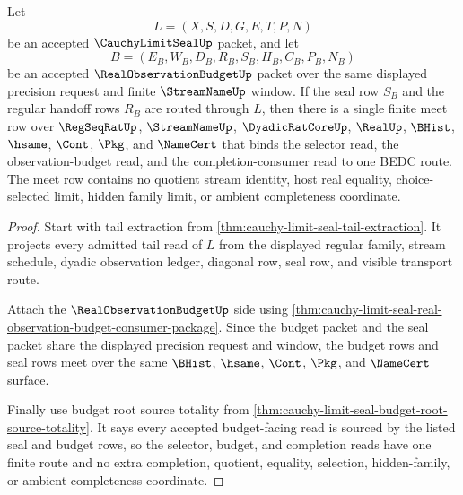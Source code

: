 \begin{theorem}
\label{thm:cauchy-limit-seal-tail-budget-meet}
Let
$$
L=(X,S,D,G,E,T,P,N)
$$
be an accepted $\CauchyLimitSealUp$ packet, and let
$$
B=(E_B,W_B,D_B,R_B,S_B,H_B,C_B,P_B,N_B)
$$
be an accepted $\RealObservationBudgetUp$ packet over the same displayed precision request and finite $\StreamNameUp$ window. If the seal row $S_B$ and the regular handoff rows $R_B$ are routed through $L$, then there is a single finite meet row over $\RegSeqRatUp$, $\StreamNameUp$, $\DyadicRatCoreUp$, $\RealUp$, $\BHist$, $\hsame$, $\Cont$, $\Pkg$, and $\NameCert$ that binds the selector read, the observation-budget read, and the completion-consumer read to one BEDC route. The meet row contains no quotient stream identity, host real equality, choice-selected limit, hidden family limit, or ambient completeness coordinate.
\end{theorem}
\begin{proof}
Start with tail extraction from \autoref{thm:cauchy-limit-seal-tail-extraction}. It projects every admitted tail read of $L$ from the displayed regular family, stream schedule, dyadic observation ledger, diagonal row, seal row, and visible transport route.

Attach the $\RealObservationBudgetUp$ side using \autoref{thm:cauchy-limit-seal-real-observation-budget-consumer-package}. Since the budget packet and the seal packet share the displayed precision request and window, the budget rows and seal rows meet over the same $\BHist$, $\hsame$, $\Cont$, $\Pkg$, and $\NameCert$ surface.

Finally use budget root source totality from \autoref{thm:cauchy-limit-seal-budget-root-source-totality}. It says every accepted budget-facing read is sourced by the listed seal and budget rows, so the selector, budget, and completion reads have one finite route and no extra completion, quotient, equality, selection, hidden-family, or ambient-completeness coordinate.
\end{proof}

